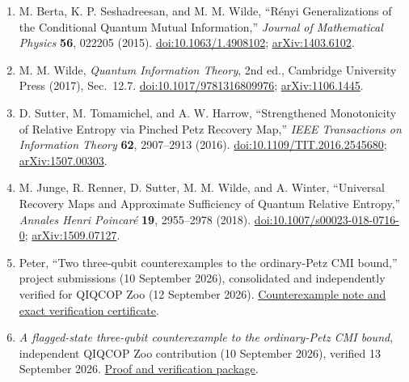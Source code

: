 \begin{enumerate}[label={},leftmargin=4.8em,labelsep=0.5em]
  \footnotesize
  \item[\textup{[BSW15]}]\label{ref:p70-berta-seshadreesan-wilde}
  M. Berta, K. P. Seshadreesan, and M. M. Wilde,
  ``R\'enyi Generalizations of the Conditional Quantum Mutual Information,''
  \emph{Journal of Mathematical Physics} \textbf{56}, 022205 (2015).
  \href{https://doi.org/10.1063/1.4908102}{doi:10.1063/1.4908102};
  \href{https://arxiv.org/abs/1403.6102}{arXiv:1403.6102}.

  \item[\textup{[Wil17]}]\label{ref:p70-wilde}
  M. M. Wilde, \emph{Quantum Information Theory}, 2nd ed., Cambridge
  University Press (2017), Sec.~12.7.
  \href{https://doi.org/10.1017/9781316809976}{doi:10.1017/9781316809976};
  \href{https://arxiv.org/abs/1106.1445}{arXiv:1106.1445}.

  \item[\textup{[STH16]}]\label{ref:p70-sutter-tomamichel-harrow}
  D. Sutter, M. Tomamichel, and A. W. Harrow,
  ``Strengthened Monotonicity of Relative Entropy via Pinched Petz Recovery
  Map,'' \emph{IEEE Transactions on Information Theory} \textbf{62},
  2907--2913 (2016).
  \href{https://doi.org/10.1109/TIT.2016.2545680}{doi:10.1109/TIT.2016.2545680};
  \href{https://arxiv.org/abs/1507.00303}{arXiv:1507.00303}.

  \item[\textup{[JRS+18]}]\label{ref:p70-junge-et-al}
  M. Junge, R. Renner, D. Sutter, M. M. Wilde, and A. Winter,
  ``Universal Recovery Maps and Approximate Sufficiency of Quantum Relative
  Entropy,'' \emph{Annales Henri Poincar\'e} \textbf{19}, 2955--2978 (2018).
  \href{https://doi.org/10.1007/s00023-018-0716-0}{doi:10.1007/s00023-018-0716-0};
  \href{https://arxiv.org/abs/1509.07127}{arXiv:1509.07127}.

  \item[\textup{[Pet26]}]\label{ref:p70-peter-counterexamples}
  Peter, ``Two three-qubit counterexamples to the ordinary-Petz CMI bound,''
project submissions (10 September 2026), consolidated and independently
verified for QIQCOP Zoo (12 September 2026).
\href{https://github.com/Naixu-Guo/quantum-open-problems/blob/main/database/proofs/ordinary-petz.md}{Counterexample note and exact verification certificate}.

  \item[\textup{[QOP26]}]\label{ref:p70-flagged-counterexample}
  \emph{A flagged-state three-qubit counterexample to the
ordinary-Petz CMI bound}, independent QIQCOP Zoo contribution (10 September
2026), verified 13 September 2026.
\href{https://github.com/Naixu-Guo/quantum-open-problems/blob/main/database/proofs/ordinary-petz-flagged.md}{Proof and verification package}.
\end{enumerate}

